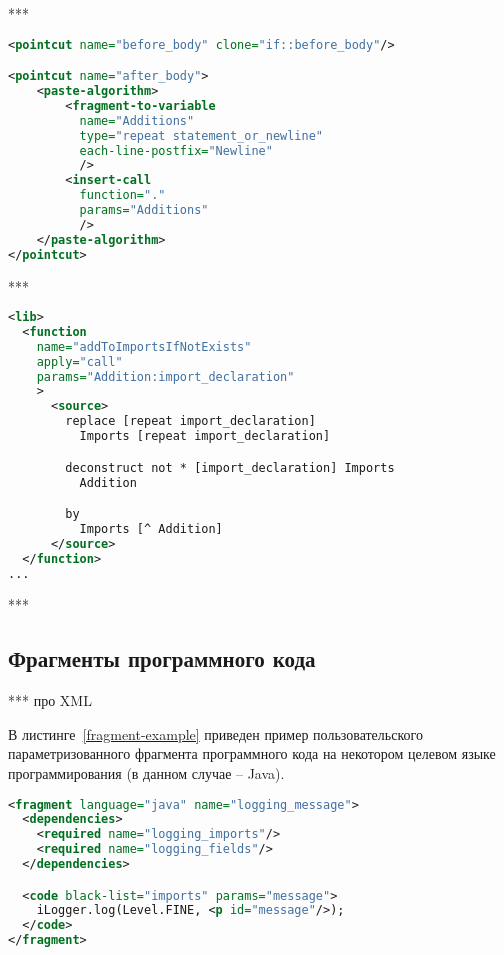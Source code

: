 ***

\begin{lstlisting}[frame=single, language=XML, label={annotation-algo-example}, caption={Пример}]
<pointcut name="before_body" clone="if::before_body"/>

<pointcut name="after_body">
    <paste-algorithm>
        <fragment-to-variable
          name="Additions"
          type="repeat statement_or_newline"
          each-line-postfix="Newline"
          />
        <insert-call
          function="."
          params="Additions"
          />
    </paste-algorithm>
</pointcut>
\end{lstlisting}

***

\begin{lstlisting}[frame=single, language=XML, label={annotation-lib-example}, caption={Пример}]
<lib>
  <function
    name="addToImportsIfNotExists"
    apply="call"
    params="Addition:import_declaration"
    >
      <source>
        replace [repeat import_declaration]
          Imports [repeat import_declaration]

        deconstruct not * [import_declaration] Imports
          Addition

        by
          Imports [^ Addition]
      </source>
  </function>
...
\end{lstlisting}

***

\subsection{Фрагменты программного кода}

***
про XML

В листинге~\ref{fragment-example} приведен пример пользовательского параметризованного фрагмента программного кода на некотором целевом языке программирования (в данном случае -- Java).

\begin{lstlisting}[frame=single, language=XML, label={fragment-example}, caption={Пример пользовательского фрагмента}]
<fragment language="java" name="logging_message">
  <dependencies>
    <required name="logging_imports"/>
    <required name="logging_fields"/>
  </dependencies>

  <code black-list="imports" params="message">
    iLogger.log(Level.FINE, <p id="message"/>);
  </code>
</fragment>
\end{lstlisting}

